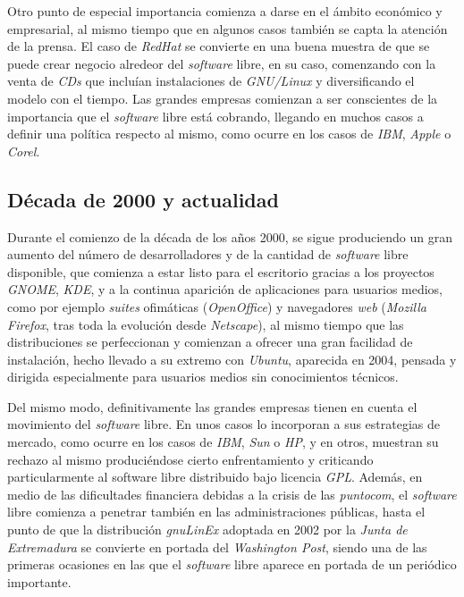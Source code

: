Otro punto de especial importancia comienza a darse en el ámbito económico y
empresarial, al mismo tiempo que en algunos casos también se capta la atención
de la prensa. El caso de \textit{RedHat} se convierte en una buena muestra de
que se puede crear negocio alredeor del \textit{software} libre, en su caso,
comenzando con la venta de \textit{CDs} que incluían instalaciones de
\textit{GNU/Linux} y diversificando el modelo con el tiempo. Las grandes
empresas comienzan a ser conscientes de la importancia que el \textit{software}
libre está cobrando, llegando en muchos casos a definir una política respecto al
mismo, como ocurre en los casos de \textit{IBM}, \textit{Apple} o
\textit{Corel}.

\subsection{Década de 2000 y actualidad}

Durante el comienzo de la década de los años 2000, se sigue produciendo un
gran aumento del número de desarrolladores y de la cantidad de \textit{software}
libre disponible, que comienza a estar listo para el escritorio gracias a los
proyectos \textit{GNOME}, \textit{KDE}, y a la continua aparición de
aplicaciones para usuarios medios, como por ejemplo \textit{suites} ofimáticas
(\textit{OpenOffice}) y navegadores \textit{web} (\textit{Mozilla Firefox}, tras
toda la evolución desde \textit{Netscape}), al mismo tiempo que las
distribuciones se perfeccionan y comienzan a ofrecer una gran facilidad de
instalación, hecho llevado a su extremo con \textit{Ubuntu}, aparecida en 2004,
pensada y dirigida especialmente para usuarios medios sin conocimientos
técnicos.

Del mismo modo, definitivamente las grandes empresas tienen en cuenta el
movimiento del \textit{software} libre. En unos casos lo incorporan a sus
estrategias de mercado, como ocurre en los casos de \textit{IBM}, \textit{Sun} o
\textit{HP}, y en otros, muestran su rechazo al mismo produciéndose cierto
enfrentamiento y criticando particularmente al software libre distribuido bajo
licencia \textit{GPL}. Además, en medio de las dificultades financiera debidas a
la crisis de las \textit{puntocom}, el \textit{software} libre comienza a
penetrar también en las administraciones públicas, hasta el punto de que la
distribución \textit{gnuLinEx} adoptada en 2002 por la \textit{Junta de
Extremadura} se convierte en portada del \textit{Washington Post}, siendo una de
las primeras ocasiones en las que el \textit{software} libre aparece en portada
de un periódico importante.

